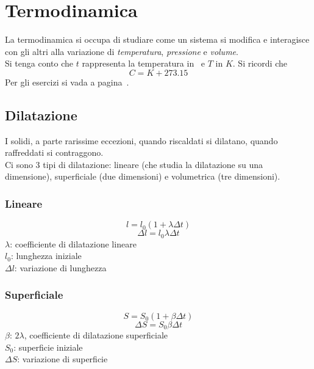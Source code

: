 
\section{Termodinamica}\label{sec:termodinamica}
La termodinamica si occupa di studiare come un sistema si modifica e interagisce con gli altri
alla variazione di \emph{temperatura}, \emph{pressione} e \emph{volume}.\\
Si tenga conto che $t$ rappresenta la temperatura in \textcelsius\ e $T$ in $K$. Si ricordi che
\begin{equation*}
  C = K + 273.15
\end{equation*}
Per gli esercizi si vada a pagina~\pageref{ex:termodinamica}.

\subsection{Dilatazione}
I solidi, a parte rarissime eccezioni, quando riscaldati si dilatano, quando raffreddati si
contraggono.\\
Ci sono 3 tipi di dilatazione: lineare (che studia la dilatazione su una dimensione), superficiale 
(due dimensioni) e volumetrica (tre dimensioni).

\subsubsection{Lineare}
\begin{equation*}
  l = l_0\left(1+\lambda\Delta t\right)
\end{equation*}
\begin{equation*}
  \Delta l = l_0\lambda\Delta t
\end{equation*}
$\lambda$: coefficiente di dilatazione lineare\\
$l_0$: lunghezza iniziale\\
$\Delta l$: variazione di lunghezza

\subsubsection{Superficiale}
\begin{equation*}
  S = S_0\left(1+\beta\Delta t\right)
\end{equation*}
\begin{equation*}
  \Delta S = S_0\beta\Delta t
\end{equation*}
$\beta$: $2\lambda$, coefficiente di dilatazione superficiale\\
$S_0$: superficie iniziale\\
$\Delta S$: variazione di superficie

